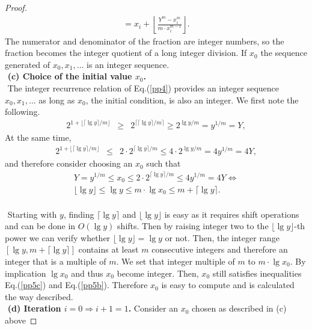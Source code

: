 \documentclass[11pt]{article}
\newcommand{\ceil}[1]{\lceil #1 \rceil}
\newcommand{\floor}[1]{\lfloor #1 \rfloor}
\begin{document}
\begin{proof}
\begin{eqnarray}
=
    x_i + \left\lfloor \frac{Y^m -x_i^m}{m \cdot x_i^{m-1}} \right\rfloor .
\end{eqnarray}
The numerator and denominator of the fraction are integer numbers,
so the fraction becomes the integer quotient of a long integer division.
If $x_0$ the sequence generated of $x_0 , x_1 , \ldots $ is an
integer sequence.
%
%
%
%
$ $ \\ $ $
{\bf (c) Choice of the initial value $x_0$.}
$ $ \\ $ $
The integer recurrence relation  of Eq.(\ref{pp4})
provides an integer sequence $x_0 , x_1 , \ldots $
as long as $x_0$, the initial condition, is also an integer.
We first note the following.
\begin{eqnarray}
\label{pp5}
 2^{1+ \floor{\ceil{\lg{y}}/m}} &\geq& 2^{\ceil{\ceil{\lg{y}}/m}} \geq
2^{\lg{y}/m} = y^{1/m} = Y,
\end{eqnarray}
At the same time,
\begin{eqnarray}
\label{pp5a}
 2^{1+ \floor{\ceil{\lg{y}}/m}} &\leq& 2 \cdot 2^{\ceil{\lg{y}}/m} \leq
4 \cdot 2^{\lg{y}/m} =  4 y^{1/m} = 4Y,
\end{eqnarray}
and therefore consider choosing an $x_0$ such that
\begin{eqnarray}
\label{pp5b}
Y= y^{1/m} \leq x_0 \leq  2 \cdot 2^{\ceil{\lg{y}}/m} \leq 4 y^{1/m} =4Y
  \Leftrightarrow\\
\label{pp5c}
 \lfloor \lg{y} \rfloor \leq \lg{y}  \leq m \cdot \lg{x_0}
\leq  m + {\ceil{\lg{y}}} .
\end{eqnarray}
$ $ \\ $ $
Starting with $y$, finding $\ceil{\lg{y}}$ and $\floor{\lg{y}}$
is easy as it requires shift operations and can be done in
$O(\lg{y})$ shifts.  
Then by raising integer two to the $\floor{\lg{y}}$-th power
we can verify whether
$\floor{\lg{y}} = \lg{y}$ or not.
Then,
the integer range $[\lg{y}  ,  m + {\ceil{\lg{y}}} ]$
contains at least $m$ consecutive integers and therefore an integer
that is a multiple of $m$.  We set that integer multiple of $m$ to  
$m \cdot \lg{x_0}$.  By implication $\lg{x_0}$ and thus $x_0$ become 
integer.
Then, $x_0$ still satisfies  inequalities
 Eq.(\ref{pp5c}) and Eq.(\ref{pp5b}).
%
Therefore $x_0$ is easy to compute and is calculated the
way described.
%
%
%
%
$ $ \\ $ $
{\bf (d) Iteration $i=0 \Rightarrow i+1=1$.}
Consider an $x_0$ chosen as described in (c) above

\end{proof}
\end{document}
